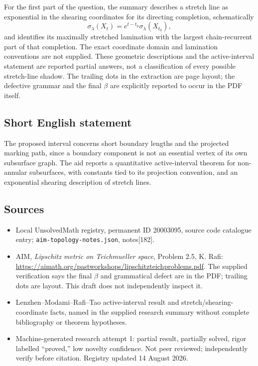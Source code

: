 \documentclass[11pt]{article}
\begin{document}
For the first part of the question, the summary describes a stretch line as exponential in the shearing coordinates for its directing completion, schematically
\[
 \sigma_\lambda(X_t)=e^{t-t_0}\sigma_\lambda(X_{t_0}),
\]
and identifies its maximally stretched lamination with the largest chain-recurrent part of that completion. The exact coordinate domain and lamination conventions are not supplied. These geometric descriptions and the active-interval statement are reported partial answers, not a classification of every possible stretch-line shadow. The trailing dots in the extraction are page layout; the defective grammar and the final $\beta$ are explicitly reported to occur in the PDF itself.
\subsection{Short English statement}
The proposed interval concerns short boundary lengths and the projected marking path, since a boundary component is not an essential vertex of its own subsurface graph. The aid reports a quantitative active-interval theorem for non-annular subsurfaces, with constants tied to its projection convention, and an exponential shearing description of stretch lines.
\subsection{Sources}
\begin{itemize}
\item Local UnsolvedMath registry, permanent ID 20003095, source code catalogue entry; \texttt{aim-topology-notes.json}, notes[182].
\item AIM, \emph{Lipschitz metric on Teichmueller space}, Problem 2.5, K. Rafi: \url{https://aimath.org/pastworkshops/lipschitzteichproblems.pdf}. The supplied verification says the final $\beta$ and grammatical defect are in the PDF; trailing dots are layout. This draft does not independently inspect it.
\item Lenzhen--Modami--Rafi--Tao active-interval result and stretch/shearing-coordinate facts, named in the supplied research summary without complete bibliography or theorem hypotheses.
\item Machine-generated research attempt 1: partial result, partially solved, rigor labelled ``proved,'' low novelty confidence. Not peer reviewed; independently verify before citation. Registry updated 14 August 2026.
\end{itemize}
\end{document}
